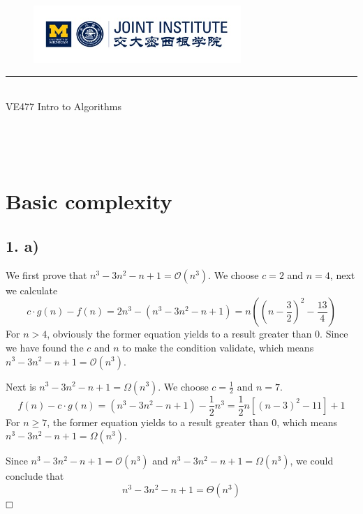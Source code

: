 \documentclass[A4paper]{article}
\newcommand{\qedhere}{$\hfill\ensuremath{\square}$}
\begin{document}
\setmainfont{Cormorant Upright}
\renewcommand\arraystretch{1.5}


\thispagestyle{empty}

\begin{center}
\begin{large}
\begin{figure}[!htbp]
\centering
\includegraphics[width=0.7\textwidth]{Logo2.png}
\end{figure}
\hrule
\vspace*{0.25cm}
 \\ 
VE477 Intro to Algorithms\\
\end{large}
\hrulefill

\vspace*{3cm}

\begin{Large}
 \\
\end{Large}
\vspace*{2cm}
\begin{large}
 \\
\end{large}
\end{center}
\newpage
\setmainfont{Optima}
\setmonofont{Optima}
\setsansfont{Optima}
\setcounter{page}{1}
\section{Basic complexity}
\subsection*{1. a)}
\par We first prove that $n^3 - 3n^2 -n +1 = \mathcal{O}(n^3)$. We choose $c=2$ and $n=4$, next we calculate 
\[
	c\cdot g(n)-f(n) = 2n^3-(n^3-3n^2-n+1) =n((n- \frac{3}{2})^2- \frac{13}{4})
\]
For $n>4$, obviously the former equation yields to a result greater than 0. Since we have found the $c$ and $n$ to make the condition validate, which means $n^3 - 3n^2 -n +1 = \mathcal{O}(n^3)$.
\par Next is $n^3 - 3n^2 -n +1 = \Omega (n^3)$. We choose $c=\frac{1}{2}$ and $n=7$. 
\[
	f(n)-c\cdot g(n) = (n^3-3n^2-n+1) - \frac{1}{2}n^3 = \frac{1}{2}n [(n-3)^2-11]+1
\]
For $n\geq 7$, the former equation yields to a result greater than 0, which means $n^3 - 3n^2 -n +1 = \Omega (n^3)$.
\par Since $n^3 - 3n^2 -n +1 = \mathcal{O}(n^3)$ and $n^3 - 3n^2 -n +1 = \Omega (n^3)$, we could conclude that $$n^3 - 3n^2 -n +1 = \Theta (n^3)$$
\qedhere
\end{document}
